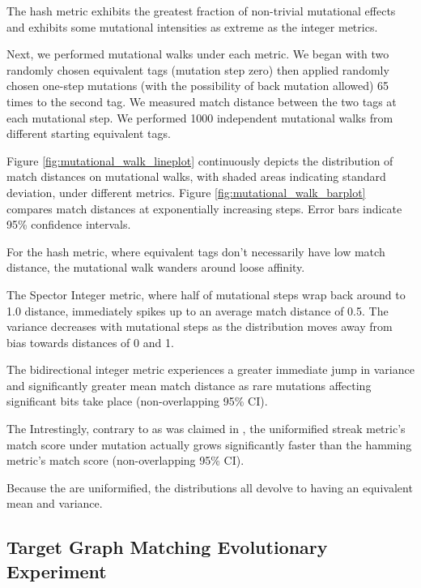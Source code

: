 The hash metric exhibits the greatest fraction of non-trivial mutational effects and exhibits some mutational intensities as extreme as the integer metrics.




Next, we performed mutational walks under each metric.
We began with two randomly chosen equivalent tags (mutation step zero) then applied randomly chosen one-step mutations (with the possibility of back mutation allowed) 65 times to the second tag.
We measured match distance between the two tags at each mutational step.
We performed 1000 independent mutational walks from different starting equivalent tags.

Figure \ref{fig:mutational_walk_lineplot} continuously depicts the distribution of match distances on mutational walks, with shaded areas indicating standard deviation, under different metrics.
Figure \ref{fig:mutational_walk_barplot} compares match distances at exponentially increasing steps.
Error bars indicate 95\% confidence intervals.

For the hash metric, where equivalent tags don't necessarily have low match distance, the mutational walk wanders around loose affinity.

The Spector Integer metric, where half of mutational steps wrap back around to 1.0 distance, immediately spikes up to an average match distance of 0.5.
The variance decreases with mutational steps as the distribution moves away from bias towards distances of 0 and 1.

The bidirectional integer metric experiences a greater immediate jump in variance and significantly greater mean match distance as rare mutations affecting significant bits take place (non-overlapping 95\% CI).

The
Intrestingly, contrary to as was claimed in \citep{downing2015intelligence}, the uniformified streak metric's match score under mutation actually grows significantly faster than the hamming metric's match score  (non-overlapping 95\% CI).

Because the are uniformified, the distributions all devolve to having an equivalent mean and variance.

\subsection{Target Graph Matching Evolutionary Experiment}



